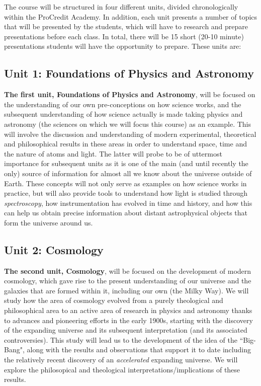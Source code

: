 \documentclass{tufte-handout}
\begin{document}
\begin{fullwidth}
The course will be structured in four different units, divided chronologically within the ProCredit Academy. In addition, each unit presents 
a number of topics that will be presented by the students, which will have to research and prepare presentations before each class. In total, 
there will be 15 short (20-10 minute) presentations students will have the opportunity to prepare. These units are:

\subsection{Unit 1: Foundations of Physics and Astronomy}
\textbf{The first unit, {\color{red}Foundations of Physics and Astronomy}}, will be focused on the understanding of our own pre-conceptions 
on how science works, and the subsequent understanding of how science actually is made taking physics and astronomy (the sciences on which 
we will focus this course) as an example. This will involve the discussion and understanding of modern experimental, theoretical and 
philosophical results in these areas in order to understand space, time and the nature of atoms and light. The latter will probe to be of 
uttermost importance for subsequent units as it is one of the main (and until recently the only) source of information for almost all we know about 
the universe outside of Earth. These concepts will not only serve as examples on how science works in practice, but will also provide tools to 
understand how light is studied through \textit{spectroscopy}, how instrumentation has evolved in time and history, and how this can help us obtain 
precise information about distant astrophysical objects that form the universe around us.

\subsection{Unit 2: Cosmology}
\textbf{The second unit, {\color{red}Cosmology}}, will be focused on the development of modern cosmology, which gave rise to the present understanding 
of our universe and the galaxies that are formed within it, including our own (the Milky Way). We will study how the area of cosmology evolved from 
a purely theological and philosophical area to an active area of research in physics and astronomy thanks to advances and pioneering efforts in the 
early 1900s, starting with the discovery of the expanding universe and its subsequent interpretation (and its associated controversies). This study 
will lead us to the development of the idea of the ``Big-Bang", along with the results and observations that support it to date including the 
relatively recent discovery of an \textit{accelerated} expanding universe. We will explore the philosopical and theological 
interpretations/implications of these results. 


\end{fullwidth}
\end{document}
